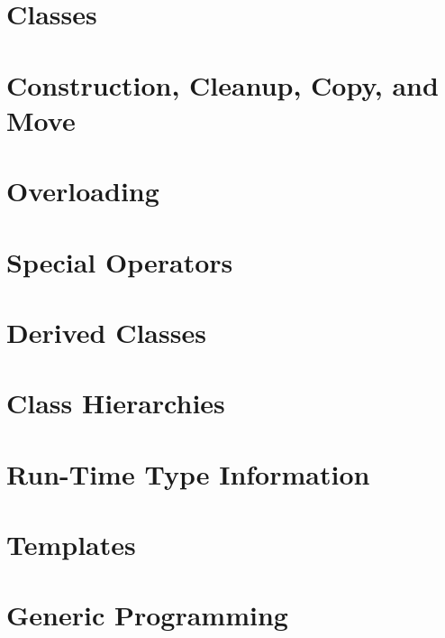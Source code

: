 \documentclass[12pt,letterpaper]{book}
\theoremstyle{definition}
\theoremstyle{remark}
\begin{document}
\chapter{Classes}


\chapter{Construction, Cleanup, Copy, and Move}


\chapter{Overloading}


\chapter{Special Operators}


\chapter{Derived Classes}


\chapter{Class Hierarchies}


\chapter{Run-Time Type Information}


\chapter{Templates}


\chapter{Generic Programming}

\end{document}
